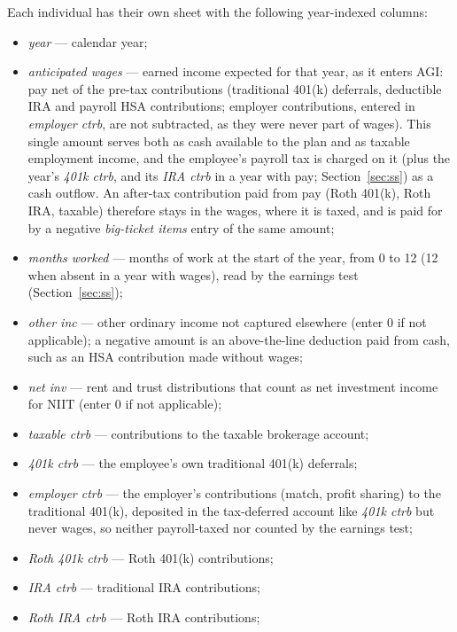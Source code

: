 \documentclass[fleqn,12pt]{report}
\begin{document}
Each individual has their own sheet with the following year-indexed columns:
\begin{itemize}[nosep]
  \item \textit{year} --- calendar year;
  \item \textit{anticipated wages} --- earned income expected for that year,
    as it enters AGI: pay net of the pre-tax contributions (traditional 401(k)
    deferrals, deductible IRA and payroll HSA contributions; employer
    contributions, entered in \textit{employer ctrb}, are not subtracted, as they
    were never part of wages). This single amount serves both as cash available to the plan
    and as taxable employment income, and the employee's payroll tax is charged on it
    (plus the year's \textit{401k ctrb}, and its \textit{IRA ctrb} in a year with pay;
    Section~\ref{sec:ss}) as a cash outflow. An after-tax contribution paid from pay
    (Roth 401(k), Roth IRA, taxable) therefore stays in the wages, where it is
    taxed, and is paid for by a negative \textit{big-ticket items} entry of the
    same amount;
  \item \textit{months worked} --- months of work at the start of the year,
    from 0 to 12 (12 when absent in a year with wages), read by the earnings test
    (Section~\ref{sec:ss});
  \item \textit{other inc} --- other ordinary income not captured elsewhere
    (enter 0 if not applicable); a negative amount is an above-the-line deduction
    paid from cash, such as an HSA contribution made without wages;
  \item \textit{net inv} --- rent and trust distributions that count as net
    investment income for NIIT (enter 0 if not applicable);
  \item \textit{taxable ctrb} --- contributions to the taxable brokerage
    account;
  \item \textit{401k ctrb} --- the employee's own traditional 401(k) deferrals;
  \item \textit{employer ctrb} --- the employer's contributions (match, profit
    sharing) to the traditional 401(k), deposited in the tax-deferred account like
    \textit{401k ctrb} but never wages, so neither payroll-taxed nor counted by the
    earnings test;
  \item \textit{Roth 401k ctrb} --- Roth 401(k) contributions;
  \item \textit{IRA ctrb} --- traditional IRA contributions;
  \item \textit{Roth IRA ctrb} --- Roth IRA contributions;

\end{itemize}
\end{document}
